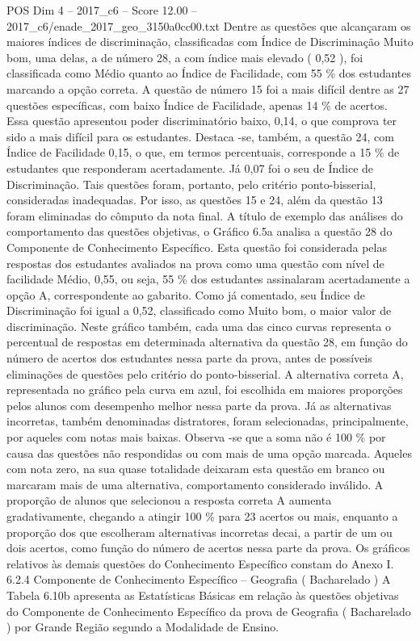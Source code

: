 \begin{textsample}{POS Dim 4 – 2017\_c6 – Score 12.00 – 2017\_c6/enade\_2017\_geo\_3150a0cc00.txt}
Dentre as questões que alcançaram os maiores índices de discriminação, classificadas com Índice de Discriminação Muito bom, uma delas, a de número 28, a com índice mais elevado ( 0,52 ), foi classificada como Médio quanto ao Índice de Facilidade, com 55 \% dos estudantes marcando a opção correta.
A questão de número 15 foi a mais difícil dentre as 27 questões específicas, com baixo Índice de Facilidade, apenas 14 \% de acertos.
Essa questão apresentou poder discriminatório baixo, 0,14, o que comprova ter sido a mais difícil para os estudantes.
Destaca -se, também, a questão 24, com Índice de Facilidade 0,15, o que, em termos percentuais, corresponde a 15 \% de estudantes que responderam acertadamente.
Já 0,07 foi o seu de Índice de Discriminação.
Tais questões foram, portanto, pelo critério ponto-bisserial, consideradas inadequadas.
Por isso, as questões 15 e 24, além da questão 13 foram eliminadas do cômputo da nota final.
A título de exemplo das análises do comportamento das questões objetivas, o Gráfico 6.5a analisa a questão 28 do Componente de Conhecimento Específico.
Esta questão foi considerada pelas respostas dos estudantes avaliados na prova como uma questão com nível de facilidade Médio, 0,55, ou seja, 55 \% dos estudantes assinalaram acertadamente a opção A, correspondente ao gabarito.
Como já comentado, seu Índice de Discriminação foi igual a 0,52, classificado como Muito bom, o maior valor de discriminação.
Neste gráfico também, cada uma das cinco curvas representa o percentual de respostas em determinada alternativa da questão 28, em função do número de acertos dos estudantes nessa parte da prova, antes de possíveis eliminações de questões pelo critério do ponto-bisserial.
A alternativa correta A, representada no gráfico pela curva em azul, foi escolhida em maiores proporções pelos alunos com desempenho melhor nessa parte da prova.
Já as alternativas incorretas, também denominadas distratores, foram selecionadas, principalmente, por aqueles com notas mais baixas.
Observa -se que a soma não é 100 \% por causa das questões não respondidas ou com mais de uma opção marcada.
Aqueles com nota zero, na sua quase totalidade deixaram esta questão em branco ou marcaram mais de uma alternativa, comportamento considerado inválido.
A proporção de alunos que selecionou a resposta correta A aumenta gradativamente, chegando a atingir 100 \% para 23 acertos ou mais, enquanto a proporção dos que escolheram alternativas incorretas decai, a partir de um ou dois acertos, como função do número de acertos nessa parte da prova.
Os gráficos relativos às demais questões do Conhecimento Específico constam do Anexo I. 6.2.4 Componente de Conhecimento Específico – Geografia ( Bacharelado ) A Tabela 6.10b apresenta as Estatísticas Básicas em relação às questões objetivas do Componente de Conhecimento Específico da prova de Geografia ( Bacharelado ) por Grande Região segundo a Modalidade de Ensino.

\end{textsample}
